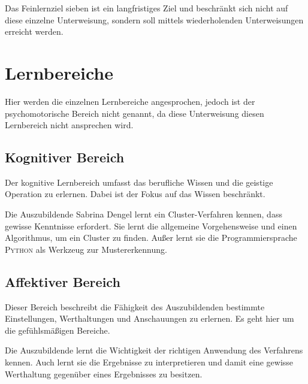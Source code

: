 Das Feinlernziel sieben ist ein langfristiges Ziel und beschränkt sich nicht auf diese einzelne Unterweisung, sondern soll mittels wiederholenden Unterweisungen erreicht werden.

\section{Lernbereiche}
Hier werden die einzelnen Lernbereiche angesprochen, jedoch ist der psychomotorische Bereich nicht genannt, da diese Unterweisung diesen Lernbereich nicht ansprechen wird.

\subsection{Kognitiver Bereich}
Der kognitive Lernbereich umfasst das berufliche Wissen und die geistige Operation zu erlernen. Dabei ist der Fokus auf das Wissen beschränkt. 
\par
Die Auszubildende Sabrina Dengel lernt ein Cluster-Verfahren kennen, dass gewisse Kenntnisse erfordert. Sie lernt die allgemeine Vorgehensweise und einen Algorithmus, um ein Cluster zu finden. Außer lernt sie die Programmiersprache \textsc{Python} als Werkzeug zur Mustererkennung.

\subsection{Affektiver Bereich}
Dieser Bereich beschreibt die Fähigkeit des Auszubildenden bestimmte Einstellungen, Werthaltungen und Anschauungen zu erlernen. Es geht hier um die gefühlsmäßigen Bereiche.
\par
Die Auszubildende lernt die Wichtigkeit der richtigen Anwendung des Verfahrens kennen. Auch lernt sie die Ergebnisse zu interpretieren und damit eine gewisse Werthaltung gegenüber eines Ergebnisses zu besitzen.


